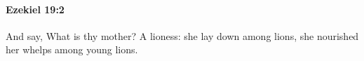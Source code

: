 
		\paragraph{Ezekiel 19:2} %
			\label{EZEKIEL-19-2}

			And say, What is thy mother? A lioness: she lay down among lions, she nourished her whelps among young lions.



